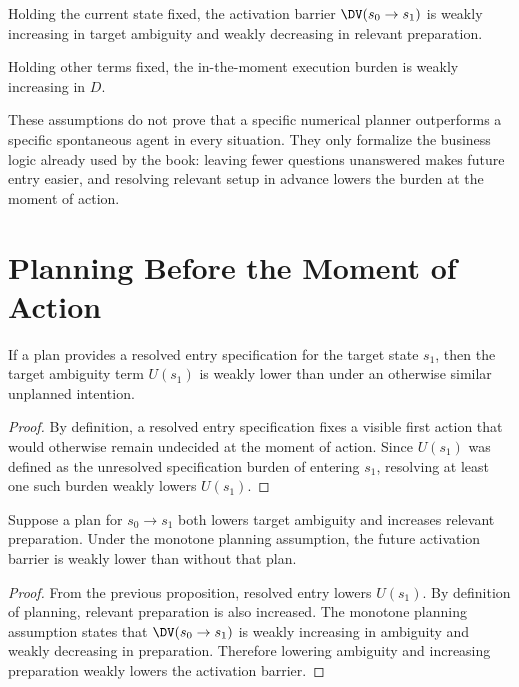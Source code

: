 \begin{axiom}
Holding the current state fixed, the activation barrier
$\DV(s_0 \to s_1)$ is weakly increasing in target ambiguity and weakly
decreasing in relevant preparation.
\end{axiom}

\begin{axiom}
Holding other terms fixed, the in-the-moment execution burden is weakly
increasing in $D$.
\end{axiom}

\begin{discussion}
These assumptions do not prove that a specific numerical planner outperforms a
specific spontaneous agent in every situation. They only formalize the business
logic already used by the book: leaving fewer questions unanswered makes future
entry easier, and resolving relevant setup in advance lowers the burden at the
moment of action.
\end{discussion}

\section{Planning Before the Moment of Action}

\begin{proposition}
If a plan provides a resolved entry specification for the target state $s_1$,
then the target ambiguity term $U(s_1)$ is weakly lower than under an otherwise
similar unplanned intention.
\end{proposition}

\begin{proof}
By definition, a resolved entry specification fixes a visible first action that
would otherwise remain undecided at the moment of action. Since $U(s_1)$ was
defined as the unresolved specification burden of entering $s_1$, resolving at
least one such burden weakly lowers $U(s_1)$.
\end{proof}

\begin{proposition}
Suppose a plan for $s_0 \to s_1$ both lowers target ambiguity and increases
relevant preparation. Under the monotone planning assumption, the future
activation barrier is weakly lower than without that plan.
\end{proposition}

\begin{proof}
From the previous proposition, resolved entry lowers $U(s_1)$. By definition
of planning, relevant preparation is also increased. The monotone planning
assumption states that $\DV(s_0 \to s_1)$ is weakly increasing in ambiguity and
weakly decreasing in preparation. Therefore lowering ambiguity and increasing
preparation weakly lowers the activation barrier.
\end{proof}

